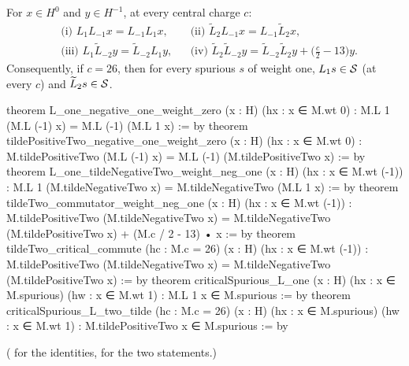 \begin{theorem}\label{ch18:thm:critical}
For $x\in H^0$ and $y\in H^{-1}$, at every central charge $c$:
\begin{align*}
 &\text{(i) } L_1L_{-1}x=L_{-1}L_1x, &&\text{(ii) } \widetilde L_2L_{-1}x=L_{-1}\widetilde L_2x,\\
 &\text{(iii) } L_1\widetilde L_{-2}y=\widetilde L_{-2}L_1y, &&\text{(iv) } \widetilde L_2\widetilde L_{-2}y=\widetilde L_{-2}\widetilde L_2y+\bigl(\tfrac c2-13\bigr)y.
\end{align*}
Consequently, if $c=26$, then for every spurious $s$ of weight one, $L_1s\in\mathcal{S}$ (at every $c$) and
$\widetilde L_2s\in\mathcal{S}$.
\end{theorem}
\begin{leancode}
theorem L_one_negative_one_weight_zero (x : H) (hx : x ∈ M.wt 0) :
    M.L 1 (M.L (-1) x) = M.L (-1) (M.L 1 x) := by
theorem tildePositiveTwo_negative_one_weight_zero (x : H) (hx : x ∈ M.wt 0) :
    M.tildePositiveTwo (M.L (-1) x) = M.L (-1) (M.tildePositiveTwo x) := by
theorem L_one_tildeNegativeTwo_weight_neg_one (x : H) (hx : x ∈ M.wt (-1)) :
    M.L 1 (M.tildeNegativeTwo x) = M.tildeNegativeTwo (M.L 1 x) := by
theorem tildeTwo_commutator_weight_neg_one (x : H) (hx : x ∈ M.wt (-1)) :
    M.tildePositiveTwo (M.tildeNegativeTwo x) =
      M.tildeNegativeTwo (M.tildePositiveTwo x) + (M.c / 2 - 13) • x := by
theorem tildeTwo_critical_commute (hc : M.c = 26) (x : H) (hx : x ∈ M.wt (-1)) :
    M.tildePositiveTwo (M.tildeNegativeTwo x) =
      M.tildeNegativeTwo (M.tildePositiveTwo x) := by
theorem criticalSpurious_L_one (x : H) (hx : x ∈ M.spurious) (hw : x ∈ M.wt 1) :
    M.L 1 x ∈ M.spurious := by
theorem criticalSpurious_L_two_tilde (hc : M.c = 26) (x : H)
    (hx : x ∈ M.spurious) (hw : x ∈ M.wt 1) : M.tildePositiveTwo x ∈ M.spurious := by
\end{leancode}
( for the identities,
 for the two  statements.)

